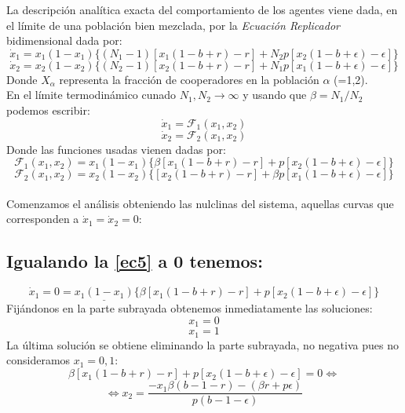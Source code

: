 \documentclass[11pt]{article}
\begin{document}
La descripción analítica exacta del comportamiento de los agentes viene dada, en el límite de una población bien mezclada, por la \textit{Ecuación Replicador} bidimensional dada por:
\begin{equation}\label{ec1}
\dot{x}_1=x_1(1-x_1)\lbrace(N_1-1)[x_1(1-b+r)-r]+N_2p[x_2(1-b+\epsilon)-\epsilon]\rbrace
\end{equation}
\begin{equation}\label{ec2}
\dot{x}_2=x_2(1-x_2)\lbrace(N_2-1)[x_2(1-b+r)-r]+N_1p[x_1(1-b+\epsilon)-\epsilon]\rbrace
\end{equation}
Donde $X_\alpha$ representa la fracción de cooperadores en la población $\alpha$ (=1,2).\\
En el límite termodinámico cunado $N_1,N_2\rightarrow\infty$ y usando que $\beta=N_1/N_2$ podemos escribir:
\begin{equation}\label{ec3}
\dot{x}_1=\mathcal{F}_1(x_1,x_2)
\end{equation}
\begin{equation}\label{ec4}
\dot{x}_2=\mathcal{F}_2(x_1,x_2)
\end{equation}
Donde las funciones usadas vienen dadas por:
\begin{equation}\label{ec5}
\mathcal{F}_1(x_1,x_2)=x_1(1-x_1)\lbrace \beta[x_1(1-b+r)-r]+p[x_2(1-b+\epsilon)-\epsilon]\rbrace
\end{equation}
\begin{equation}\label{ec6}
\mathcal{F}_2(x_1,x_2)=x_2(1-x_2)\lbrace [x_2(1-b+r)-r]+\beta p[x_1(1-b+\epsilon)-\epsilon]\rbrace
\end{equation}\\




\noindent Comenzamos el análisis obteniendo las nulclinas del sistema, aquellas curvas que corresponden a $\dot{x}_1=\dot{x}_2=0$:

\subsection*{Igualando la \autoref{ec5} a 0 tenemos:}
\begin{equation*}
\dot{x}_1=0=\underline{x_1(1-x_1)}\lbrace \beta[x_1(1-b+r)-r]+p[x_2(1-b+\epsilon)-\epsilon]\rbrace
\end{equation*}
Fijándonos en la parte subrayada obtenemos inmediatamente las soluciones:
\begin{equation}\label{ec7}
x_1=0
\end{equation}
\begin{equation}\label{ec8}
x_1=1
\end{equation}
La última solución se obtiene eliminando la parte subrayada, no  negativa pues no consideramos $x_1=0,1$:
\begin{equation*}
\beta[x_1(1-b+r)-r]+p[x_2(1-b+\epsilon)-\epsilon]=0\Longleftrightarrow
\end{equation*}
\begin{equation}\label{ec9}
\Longleftrightarrow x_2=\dfrac{-x_1\beta(b-1-r)-(\beta r+p\epsilon)}{p(b-1-\epsilon)}
\end{equation}
\end{document}
